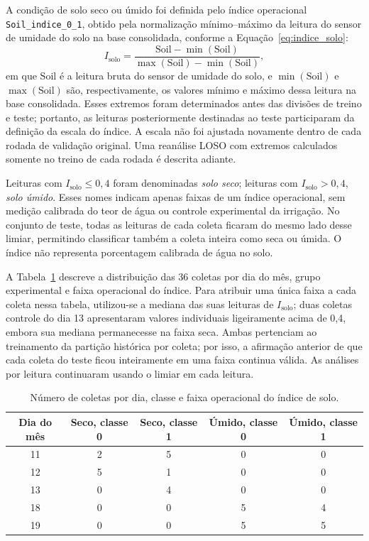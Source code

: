 A condição de solo seco ou úmido foi definida pelo índice operacional
\texttt{Soil\_indice\_0\_1}, obtido pela normalização mínimo--máximo da leitura
do sensor de umidade do solo na base consolidada, conforme a
Equação~\eqref{eq:indice_solo}:
\begin{equation}
    I_{\mathrm{solo}} =
    \frac{\mathrm{Soil}-\min(\mathrm{Soil})}
         {\max(\mathrm{Soil})-\min(\mathrm{Soil})},
    \label{eq:indice_solo}
\end{equation}
em que $\mathrm{Soil}$ é a leitura bruta do sensor de umidade do solo, e
$\min(\mathrm{Soil})$ e $\max(\mathrm{Soil})$ são, respectivamente, os valores
mínimo e máximo dessa leitura na base consolidada.
Esses extremos foram determinados antes das divisões de treino e teste;
portanto, as leituras posteriormente destinadas ao teste participaram da
definição da escala do índice. A escala não foi ajustada novamente dentro
de cada rodada de validação original. Uma reanálise LOSO com extremos
calculados somente no treino de cada rodada é descrita adiante.

Leituras com $I_{\mathrm{solo}}\leq 0{,}4$ foram denominadas \emph{solo seco};
leituras com $I_{\mathrm{solo}}>0{,}4$, \emph{solo úmido}. Esses nomes indicam
apenas faixas de um índice operacional, sem medição calibrada do teor de água
ou controle experimental da irrigação. No conjunto de
teste, todas as leituras de cada coleta ficaram do mesmo lado desse limiar,
permitindo classificar também a coleta inteira como seca ou úmida. O índice não
representa porcentagem calibrada de água no solo.

A Tabela~\ref{tab:solo_classe_dia} descreve a distribuição das 36
coletas por dia do mês, grupo experimental e faixa operacional do índice.
Para atribuir uma única faixa a cada coleta nessa tabela, utilizou-se a
mediana das suas leituras de $I_{\mathrm{solo}}$; duas coletas controle do
dia 13 apresentaram valores individuais ligeiramente acima de 0,4,
embora sua mediana permanecesse na faixa seca. Ambas pertenciam ao
treinamento da partição histórica por coleta; por isso, a afirmação anterior
de que cada coleta do teste ficou inteiramente em uma faixa continua válida.
As análises por leitura
continuaram usando o limiar em cada leitura.

\begin{table}[H]
    \centering
    \caption{Número de coletas por dia, classe e faixa operacional do índice de solo.}
    \label{tab:solo_classe_dia}
    \begin{tabular}{ccccc}
        \hline
        Dia do mês & Seco, classe 0 & Seco, classe 1 & Úmido, classe 0 & Úmido, classe 1 \\
        \hline
        11 & 2 & 5 & 0 & 0 \\
        12 & 5 & 1 & 0 & 0 \\
        13 & 0 & 4 & 0 & 0 \\
        18 & 0 & 0 & 5 & 4 \\
        19 & 0 & 0 & 5 & 5 \\
        \hline
    \end{tabular}
\end{table}

